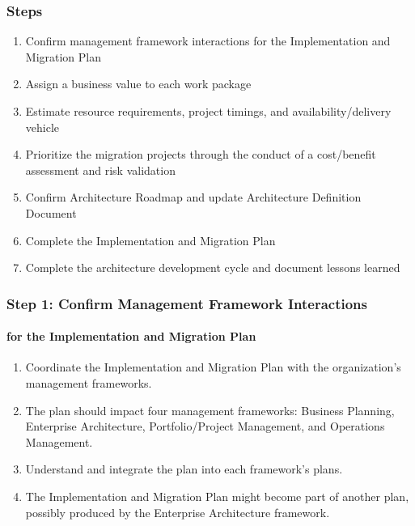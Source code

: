 \documentclass[aspectratio=169, table]{beamer}
\begin{document}
	
	\begin{frame}
		\frametitle{Steps}
		\vspace{20pt}
		\begin{enumerate}
			\item Confirm management framework interactions for the Implementation and Migration Plan
			\item Assign a business value to each work package
			\item Estimate resource requirements, project timings, and availability/delivery vehicle
			\item Prioritize the migration projects through the conduct of a cost/benefit assessment and risk validation
			\item Confirm Architecture Roadmap and update Architecture Definition Document
			\item Complete the Implementation and Migration Plan
			\item Complete the architecture development cycle and document lessons learned
		\end{enumerate}
	\end{frame}
	
	\begin{frame}
		\frametitle{Step 1: Confirm Management Framework Interactions}
		\framesubtitle{for the Implementation and Migration Plan}
		\vspace{20pt}
			\begin{enumerate}
				\item Coordinate the Implementation and Migration Plan with the organization's management frameworks.
				\item The plan should impact four management frameworks: Business Planning, Enterprise Architecture, Portfolio/Project Management, and Operations Management.
				\item Understand and integrate the plan into each framework's plans.
				\item The Implementation and Migration Plan might become part of another plan, possibly produced by the Enterprise Architecture framework.
			\end{enumerate}
	\end{frame}
\end{document}
